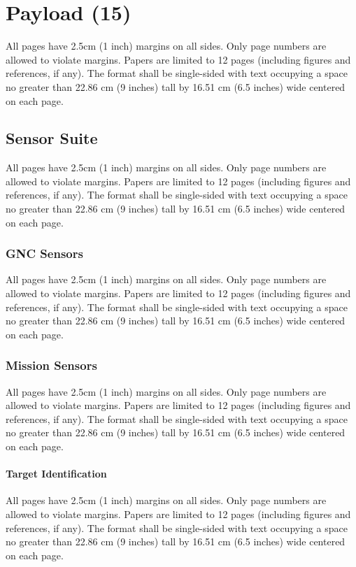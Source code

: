 \documentclass[12pt, letterpaper]{article}
\begin{document}
\section{Payload (15)}
All pages have 2.5cm (1 inch) margins on all sides. Only page numbers are allowed to violate margins. Papers are limited to 12 pages (including figures and references, if any). The format shall be single-sided with text occupying a space no greater than 22.86 cm (9 inches) tall by 16.51 cm (6.5 inches) wide centered on each page.

\subsection{Sensor Suite}
All pages have 2.5cm (1 inch) margins on all sides. Only page numbers are allowed to violate margins. Papers are limited to 12 pages (including figures and references, if any). The format shall be single-sided with text occupying a space no greater than 22.86 cm (9 inches) tall by 16.51 cm (6.5 inches) wide centered on each page.

\subsubsection{GNC Sensors}
All pages have 2.5cm (1 inch) margins on all sides. Only page numbers are allowed to violate margins. Papers are limited to 12 pages (including figures and references, if any). The format shall be single-sided with text occupying a space no greater than 22.86 cm (9 inches) tall by 16.51 cm (6.5 inches) wide centered on each page.

\subsubsection{Mission Sensors}
All pages have 2.5cm (1 inch) margins on all sides. Only page numbers are allowed to violate margins. Papers are limited to 12 pages (including figures and references, if any). The format shall be single-sided with text occupying a space no greater than 22.86 cm (9 inches) tall by 16.51 cm (6.5 inches) wide centered on each page.

\paragraph{Target Identification}
All pages have 2.5cm (1 inch) margins on all sides. Only page numbers are allowed to violate margins. Papers are limited to 12 pages (including figures and references, if any). The format shall be single-sided with text occupying a space no greater than 22.86 cm (9 inches) tall by 16.51 cm (6.5 inches) wide centered on each page.
\end{document}
